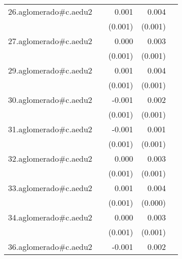 {\begin{longtable}{l*{4}{D{.}{.}{-1}}}
\addlinespace
26.aglomerado#c.aedu2&                     &       0.001         &       0.004\sym{***}&                     \\
            &                     &     (0.001)         &     (0.001)         &                     \\
\addlinespace
27.aglomerado#c.aedu2&                     &       0.000         &       0.003\sym{***}&                     \\
            &                     &     (0.001)         &     (0.001)         &                     \\
\addlinespace
29.aglomerado#c.aedu2&                     &       0.001         &       0.004\sym{***}&                     \\
            &                     &     (0.001)         &     (0.001)         &                     \\
\addlinespace
30.aglomerado#c.aedu2&                     &      -0.001         &       0.002\sym{*}  &                     \\
            &                     &     (0.001)         &     (0.001)         &                     \\
\addlinespace
31.aglomerado#c.aedu2&                     &      -0.001         &       0.001         &                     \\
            &                     &     (0.001)         &     (0.001)         &                     \\
\addlinespace
32.aglomerado#c.aedu2&                     &       0.000         &       0.003\sym{***}&                     \\
            &                     &     (0.001)         &     (0.001)         &                     \\
\addlinespace
33.aglomerado#c.aedu2&                     &       0.001         &       0.004\sym{***}&                     \\
            &                     &     (0.001)         &     (0.000)         &                     \\
\addlinespace
34.aglomerado#c.aedu2&                     &       0.000         &       0.003\sym{**} &                     \\
            &                     &     (0.001)         &     (0.001)         &                     \\
\addlinespace
36.aglomerado#c.aedu2&                     &      -0.001         &       0.002\sym{**} &                     \\

\end{longtable}}
